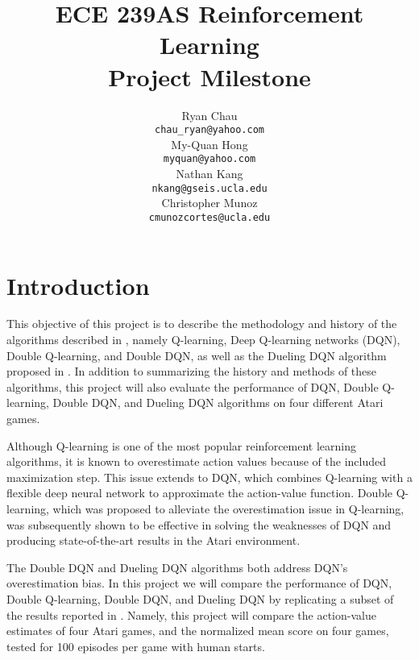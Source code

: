 \documentclass{article}
\title{ECE 239AS Reinforcement Learning\\
       Project Milestone}
\author{%
    Ryan Chau \\
    \texttt{chau\_ryan@yahoo.com}\\
    \And
    My-Quan Hong \\
    \texttt{myquan@yahoo.com} \\
    \And
    Nathan Kang \\
    \texttt{nkang@gseis.ucla.edu} \\
    \And
    Christopher Munoz \\
    \texttt{cmunozcortes@ucla.edu} \\
}
\begin{document}
\maketitle

\section{Introduction}
This objective of this project is to describe the methodology and
history of the algorithms described in \citet{van2016deep}, namely Q-learning,
Deep Q-learning networks (DQN), Double Q-learning, and Double DQN, as well as the 
Dueling DQN algorithm proposed in \citet{wang2015dueling}. In addition to summarizing
the history and methods of these algorithms, this project will also evaluate the
performance of DQN, Double Q-learning, Double DQN, and Dueling DQN
algorithms on four different Atari games.

Although Q-learning is one of the most popular reinforcement learning algorithms, it is known
to overestimate action values because of the included maximization step. This
issue extends to DQN, which combines Q-learning with a
flexible deep neural network to approximate the action-value function. Double
Q-learning, which was proposed to alleviate the overestimation issue in
Q-learning, was subsequently shown to be effective in solving the weaknesses of
DQN and producing state-of-the-art results in the Atari environment.



The Double DQN and Dueling DQN algorithms both address DQN's
overestimation bias. In this project we will compare the performance of DQN, 
Double Q-learning, Double DQN, and Dueling DQN by replicating 
a subset of the results reported in \cite{van2016deep}. Namely, this project 
will compare the action-value estimates of four Atari games, and the 
normalized mean score on four games, tested for 100 episodes per game
with human starts. 
\end{document}

